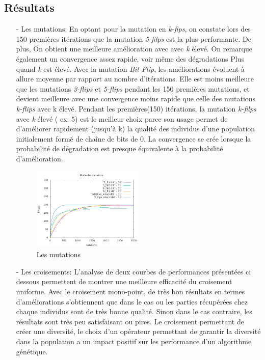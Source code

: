 \documentclass[twocolumn]{article}
\begin{document}
\subsection{Résultats}
\begin{itemize}
\item [-] Les mutations: 
En optant pour la mutation en \emph{k-fips}, on constate lors des 150 premières itérations que la mutation \emph{5-filps} est la plus performante. De plus, On obtient une meilleure amélioration avec avec \emph{k} élevé. On remarque également un convergence assez rapide, voir même des dégradations Plus quand \emph{k} est élevé.
Avec la  mutation \emph{Bit-Flip}, les améliorations évoluent à allure moyenne par rapport au nombre d'itérations. Elle est moins meilleure que les mutations \emph{3-flips} et \emph{5-flips}  pendant les 150 premières mutations, et devient meilleure avec une  convergence moins rapide que celle des mutations \emph{k-flips} avec k élevé.
Pendant les premières(150) itérations, la mutation \emph{k-filps} avec \emph{k} élevé ( ex: 5) est le meilleur choix parce son usage permet de d'améliorer rapidement (jusqu'à k) la qualité des individus d'une population initialement formé de chaîne de bits de 0. La convergence se crée lorsque la probabilité de dégradation est presque équivalente à la probabilité d'amélioration.

\begin{figure}[h]
    \centering
    \includegraphics[width=0.5\textwidth]{mutations}{\centering}
    \caption{Les mutations}
    \label{fig:mesh1}
\end{figure}

\item [-] Les croisements:
L'analyse de deux courbes de performances présentées ci dessous permettent de montrer une meilleure efficacité du croisement uniforme. Avec le croisement mono-point, de très bon résultats en termes d'améliorations s'obtiennent que dans le cas ou  les parties récupérées chez chaque individus sont de très bonne qualité. Sinon dans le cas contraire, les résultats sont très peu satisfaisant ou pires. Le croisement permettant de créer une diversité, le choix d'un opérateur permettant de garantir la diversité dans la population a un impact positif sur les performance d'un algorithme génétique.



\end{itemize}
\end{document}
